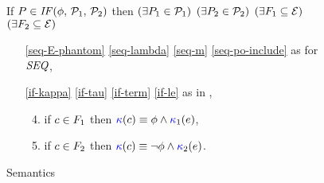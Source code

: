 \begin{figure}
\begin{multicols}{2}
  \end{multicols}
  \medskip

  \noindent
  If $\aPS \in \sIF{\aForm}\sTHEN\aPSS_1\sELSE\aPSS_2\sFI$ then
  $(\exists P_1\in\mathcal{P}_1)$ $(\exists P_2\in\mathcal{P}_2)$
  $(\exists F_1\subseteq\mathcal{E})$ $(\exists F_2\subseteq\mathcal{E})$
  \begin{multicols}{2}
    \begin{enumerate}[topsep=0pt,label=(\textsc{i}\arabic*),ref=\textsc{i}\arabic*]

    \item[\eqref{seq-E-phantom}]
      \eqref{seq-lambda}\;
      \eqref{seq-m}\;
      \eqref{seq-po-include}\;
      as for $\sSEMI{}{}$,

    \item[\eqref{if-kappa}]
      \eqref{if-tau}\;
      \eqref{if-term}\; 
      \eqref{if-le}\;
      as in ,

      \columnbreak
      \setcounter{enumi}{\value{kappa}}
    \item[] 
      \begin{enumerate}[leftmargin=0pt]
        \setcounter{enumii}{3}
      \item \label{if-kappa-phantom1}
        if $c\in F_1$ then ${\color{blue}\kappa}(c) \mathrel{\equiv} \phi\land{\color{blue}\kappa}_1(e)$,
      \item \label{if-kappa-phantom2} 
        if $c\in F_2$ then ${\color{blue}\kappa}(c) \mathrel{\equiv} \lnot\phi\land{\color{blue}\kappa}_2(e)$.
      \end{enumerate}      

      
    \end{enumerate}
  \end{multicols}
  \medskip

  \caption{\PwTcTITLE{} Semantics}
  \label{fig:c11}
\end{figure}
